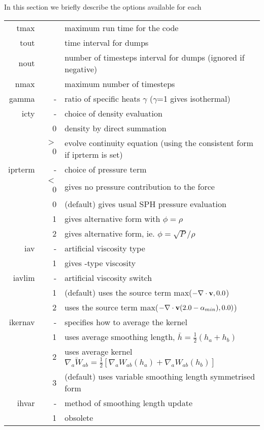 \documentclass[a4paper,12pt]{article}
\begin{document}
In this section we briefly describe the options available for each 
\begin{table}[!h]
\begin{tabular}{rrp{}}
\hline
tmax & & maximum run time for the code \\
tout & & time interval for dumps \\
nout & & number of timesteps interval for dumps (ignored if negative) \\
nmax & &maximum number of timesteps \\
gamma & - & ratio of specific heats $\gamma$ ($\gamma$=1 gives isothermal) \\
icty & - & choice of density evaluation \\
    & 0 & density by direct summation \\
    & $>$0 & evolve continuity equation (using the consistent form if
    iprterm is set) \\
iprterm & - & choice of pressure term \\
    & $<$ 0 & gives no pressure contribution to the force \\
    & 0 & (default) gives usual SPH pressure evaluation \\
    & 1 & gives alternative form with $\phi = \rho$ \\
    & 2 & gives \citet{hk89} alternative form, ie. $\phi = \sqrt{P}/\rho$ \\ 
iav & - & artificial viscosity type \\
    & 1 & gives \citet{monaghan97}-type viscosity \\
iavlim & - & \citet{mm97} artificial viscosity switch \\
       & 1 & (default) uses the source term max($-\nabla\cdot{\bf v}, 0.0$) \\
       & 2 & uses the source term max($-\nabla\cdot{\bf v}(2.0-\alpha_{min}), 0.0)$) \\
ikernav & - & specifies how to average the kernel \\
        & 1 & uses average smoothing length, $\bar{h} = \frac12(h_a + h_b)$\\
	& 2 & uses average kernel $\bar{\nabla_a W_{ab}} = \frac12[\nabla_a
	W_{ab}(h_a) + \nabla_a W_{ab}(h_b)]$ \\
	& 3 & (default) uses variable smoothing length symmetrised form \\
ihvar   & - & method of smoothing length update \\
        & 1 & obsolete \\

\end{tabular}
\end{table}
\end{document}
